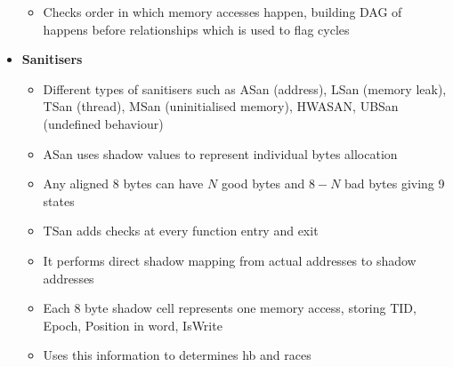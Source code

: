 \documentclass[10pt, landscape]{article}
\begin{document}
\begin{multicols*}{3}
\begin{itemize}
\begin{itemize}
        \item Checks order in which memory accesses happen, building DAG of happens before relationships which is used to flag cycles
    \end{itemize}
    \item \textbf{Sanitisers}
    \begin{itemize}
        \item Different types of sanitisers such as ASan (address), LSan (memory leak), TSan (thread), MSan (uninitialised memory), HWASAN, UBSan (undefined behaviour)
        \item ASan uses shadow values to represent individual bytes allocation
        \item Any aligned 8 bytes can have $N$ good bytes and $8-N$ bad bytes giving 9 states
        \item TSan adds checks at every function entry and exit
        \item It performs direct shadow mapping from actual addresses to shadow addresses
        \item Each 8 byte shadow cell represents one memory access, storing TID, Epoch, Position in word, IsWrite
        \item Uses this information to determines hb and races
    \end{itemize}
\end{itemize}


\end{multicols*}
\end{document}
